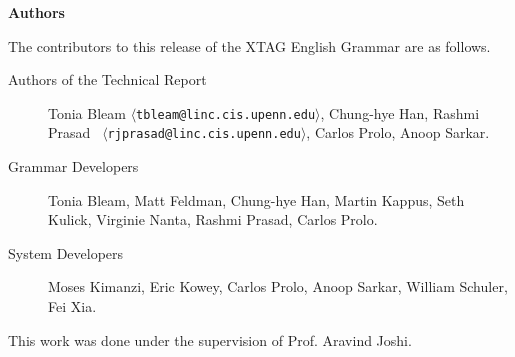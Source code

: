 \pagestyle{plain}
\null\vfil
\begin{center}
{\bf Authors}
\end{center}
\setcounter{page}{0}

The contributors to this release of the XTAG English Grammar are as
follows.

\begin{description}
\item[Authors of the Technical Report]
Tonia Bleam {\tt $\langle$tbleam@linc.cis.upenn.edu$\rangle$},
Chung-hye Han, Rashmi Prasad {\tt
$\langle$rjprasad@linc.cis.upenn.edu$\rangle$}, Carlos Prolo, Anoop
Sarkar. 

\item[Grammar Developers]
Tonia Bleam, Matt Feldman, Chung-hye Han, Martin Kappus, Seth
Kulick, Virginie Nanta, Rashmi Prasad, Carlos Prolo.

\item[System Developers]
Moses Kimanzi, Eric Kowey, Carlos Prolo, Anoop Sarkar, William
Schuler, Fei Xia.

\end{description}

This work was done under the supervision of Prof. Aravind Joshi.

\newpage

